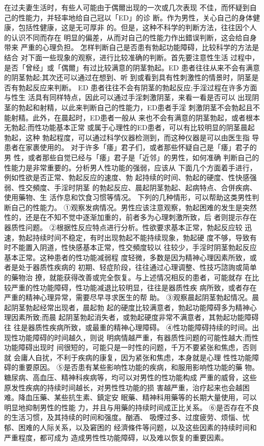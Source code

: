 \documentclass[12pt,UTF8]{ctexbook}
\begin{document}
在过夫妻生活时，有些人可能由于偶爾出现的一次或几次表现
不佳，而怀疑到自己的性能力，并轻率地给自己冠以「ED」的诊
断。作为男性，关心自己的身体健康，包括性健康，这是无可厚非
的。但是，这种不科学的判断方法，往往因个人的认识不同而存在
明显的偏差，从而对自己的性能力作出錯误判断，这会给自身带来
严重的心理负担。
怎样判断自己是否患有勃起功能障碍，比较科学的方法是结合
对下面一些现象的观察，进行比较准确的判断。首先要注意性生活
过程中，是否「曾经」或「偶爾」有过比较满意的阴茎勃起。ED
患者往往从来不会有满意的阴茎勃起;其次还可以通过在想到、听
到或看到具有性刺激性的情景时，阴茎是否有勃起反应来判断。
ED 患者往往不会有阴茎的勃起反应;手淫过程在许多方面与性生
活具有同样特点，因此可以通过手淫刺激阴茎，来看一看是否可以
出现阴茎的勃起和射精，以此来判断自己的性能力，ED患者手淫
刺激阴茎不会勃起且不能射精。此外，在晨起时，ED患者一般从
来也不会有满意的阴茎勃起，或者根本无勃起;而性功能基本正常
或属于心理性的ED患者，可以有比较明显的阴茎晨起勃起，这种
勃起程度，可以通过科学仪器检测到，而这种仪器是可以由医生指
导患者在家裹使用的。
对于许多「痿」君子们，或者那些怀疑自己是「痿」君子的男
性，或者那些自觉已经与「痿」君子是「近邻」的男性，如何准确
判断自己的性能力是非常重要的。分析男人性功能的强弱，应该从
下面几个方面着手进行，例如性欲是否正常、勃起反应的速度、勃
起持续的时间、勃起的硬度、性快感强弱、性交頻度、手淫时阴茎
的勃起反应、晨起阴茎勃起、起病特点、合併疾病、使用藥物、生
活作息和饮食习惯等情况。
下列的几种情形，可以帮助这类男性判断自己的性能力。
①观察发病情况。男性应该注意观察，勃起困难的发生是突然
性的，还是在不知不觉中逐渐加重的，前者多为心理刺激所致，后
者则提示存在器质性问题。
②根据性反应特点进行分析。性欲要求基本正常，勃起反应较
迅速，勃起持续时间不稳定，有时出现勃起不能持续现象，勃起硬
度不够，导致有时不能置入阴道，性快感基本正常，性交頻度较以
往较少，手淫时阴茎勃起反应基本正常。这种患者的性功能减弱程
度轻微，多数是因为精神心理因素所致，或者是处于器质性疾病的
初期、轻症阶段，往往通过心理调整、性技巧諮詢或简单的藥物治
撩，就能获得改善或完全恢复。与上述情况相反的患者，可能就存
在比较严重的性功能障碍，性功能减退比较明显，往往是器质性疾
病所致，或者存在严重的精神心理异常，需要尽早寻求医生的帮
助。
③观察晨起阴茎勃起情况。晨起阴茎勃起经常出现者，晨起勃
起的硬度比较满意者，勃起功能障碍多为精神心理因素所致;而晨
起阴茎勃起消失者，或勃起硬度非常不满意者，其勃起功能障碍往
往是器质性疾病所致，或最重的精神心理障碍。
④性功能障碍持续的时间。出现性功能障碍的时间越久，则说
明病情越严重，有器质性问题的可能性越大;而性功能障碍出现时
间很短的，可能只是一时性的问题，千万不要紧张和焦虑，否则就
会庸人自扰，不利于疾病的康复，因为紧张和焦虑，本身就是心理
性性功能障碍的重要原因。
⑤是否患有某些影响性功能的疾病，和服用影响性功能的藥
物。糖尿病、高血压、精神科疾病等，均可以对男性的性功能构成
严重的威脅，这些原发性疾病的持续时间越长，对男性性功能的损
害越严重，治疗起来也会越困难。降血压藥、某些抗生素、鎮定安
眠藥、精神科用藥等的长期大量使用，可以明显地抑制男性的性能
力，并且与用藥的持续时间成正比关系。
⑥是否存在不良的生活习惯，及其持续的时间和强度。酗酒、
吸煙过多、过度疲劳、烦惱、忧郁、困难的人际关系，以及窘困的
经濟條件等问题，以及这些因素的持续时间和严重程度，都可成为
造成男性性功能障碍，以及难以恢复的重要因素。
\end{document}
